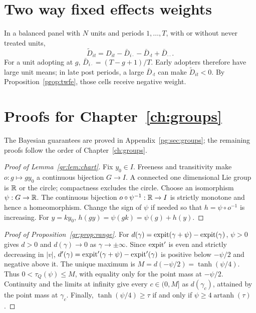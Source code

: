 \section{Two way fixed effects weights}

In a balanced panel with $N$ units and periods $1,\ldots,T$, with or without never treated units,
\[
\tilde D_{it}=D_{it}-\bar D_{i\cdot}-\bar D_{\cdot t}+\bar D_{\cdot\cdot}.
\]
For a unit adopting at $g$, $\bar D_{i\cdot}=(T-g+1)/T$. Early adopters therefore have large unit means; in late post periods, a large $\bar D_{\cdot t}$ can make $\tilde D_{it}<0$. By Proposition~\ref{prop:twfe}, those cells receive negative weight.

\section{Proofs for Chapter~\ref{ch:groups}}\label{app:groupsproofs}

The Bayesian guarantees are proved in Appendix~\ref{pg:sec:groups}; the remaining proofs follow the order of Chapter~\ref{ch:groups}.

\begin{proof}[Proof of Lemma~\ref{gr:lem:chart}]
Fix $y_0\in I$. Freeness and transitivity make $o:g\mapsto gy_0$ a continuous bijection $G\to I$. A connected one dimensional Lie group is $\mathbb{R}$ or the circle; compactness excludes the circle. Choose an isomorphism $\psi:G\to\mathbb{R}$. The continuous bijection $o\circ\psi^{-1}:\mathbb{R}\to I$ is strictly monotone and hence a homeomorphism. Change the sign of $\psi$ if needed so that $h=\psi\circ o^{-1}$ is increasing. For $y=ky_0$, $h(gy)=\psi(gk)=\psi(g)+h(y)$.
\end{proof}

\begin{proof}[Proof of Proposition~\ref{gr:prop:range}]
For $d(\gamma)=\operatorname{expit}(\gamma+\psi)-\operatorname{expit}(\gamma)$, $\psi>0$ gives $d>0$ and $d(\gamma)\to0$ as $\gamma\to\pm\infty$. Since $\operatorname{expit}'$ is even and strictly decreasing in $|v|$, $d'(\gamma)=\operatorname{expit}'(\gamma+\psi)-\operatorname{expit}'(\gamma)$ is positive below $-\psi/2$ and negative above it. The unique maximum is $M=d(-\psi/2)=\tanh(\psi/4)$. Thus $0<\tau_Q(\psi)\le M$, with equality only for the point mass at $-\psi/2$. Continuity and the limits at infinity give every $c\in(0,M]$ as $d(\gamma_c)$, attained by the point mass at $\gamma_c$. Finally, $\tanh(\psi/4)\ge\tau$ if and only if $\psi\ge4\operatorname{artanh}(\tau)$.
\end{proof}

